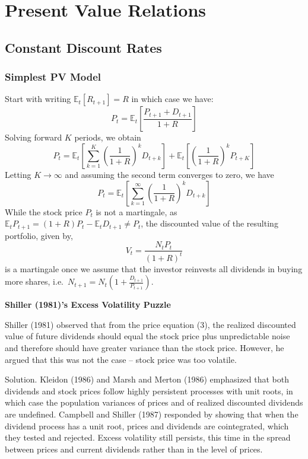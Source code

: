 \documentclass[
]{book}
\begin{document}
\hypertarget{present-value-relations}{%
\chapter{Present Value Relations}\label{present-value-relations}}

\hypertarget{constant-discount-rates}{%
\section{Constant Discount Rates}\label{constant-discount-rates}}

\hypertarget{simplest-pv-model}{%
\subsection{\texorpdfstring{\textbf{Simplest PV Model}}{Simplest PV Model}}\label{simplest-pv-model}}

Start with writing \(\mathbb{E}_{t}\left[R_{t+1}\right]=R\) in which case we have:
\[
P_{t}=\mathbb{E}_{t}\left[\frac{P_{t+1}+D_{t+1}}{1+R}\right]
\]
Solving forward \(K\) periods, we obtain
\[
P_{t}=\mathbb{E}_{t}\left[\sum_{k=1}^{K}\left(\frac{1}{1+R}\right)^{k}D_{t+k}\right]+\mathbb{E}_{t}\left[\left(\frac{1}{1+R}\right)^{k}P_{t+K}\right]
\]
Letting \(K\to\infty\) and assuming the second term converges to zero, we have
\[
P_{t}=\mathbb{E}_{t}\left[\sum_{k=1}^{\infty}\left(\frac{1}{1+R}\right)^{k}D_{t+k}\right]
\]
While the stock price \(P_t\) is not a martingale, as \(\mathbb{E}_{t}P_{t+1}=\left(1+R\right)P_{t}-\mathbb{E}_{t}D_{t+1}\neq P_{t}\), the discounted value of the resulting portfolio, given by,
\[
V_{t}=\frac{N_{t}P_{t}}{\left(1+R\right)^{t}}
\]
is a martingale once we assume that the investor reinvests all dividends in buying more shares, i.e.~\(N_{t+1}=N_{t}\left(1+\frac{D_{t+1}}{P_{t+1}}\right)\).

\textbf{Shiller (1981)'s Excess Volatility Puzzle}

Shiller (1981) observed that from the price equation (3), the realized discounted value of future dividends should equal the stock price plus unpredictable noise and therefore should have greater variance than the stock price. However, he argued that this was not the case -- stock price was too volatile.

Solution. Kleidon (1986) and Marsh and Merton (1986) emphasized that both dividends and stock prices follow highly persistent processes with unit roots, in which case the population variances of prices and of realized discounted dividends are undefined. Campbell and Shiller (1987) responded by showing that when the dividend process has a unit root, prices and dividends are cointegrated, which they tested and rejected. Excess volatility still persists, this time in the spread between prices and current dividends rather than in the level of prices.
\end{document}
